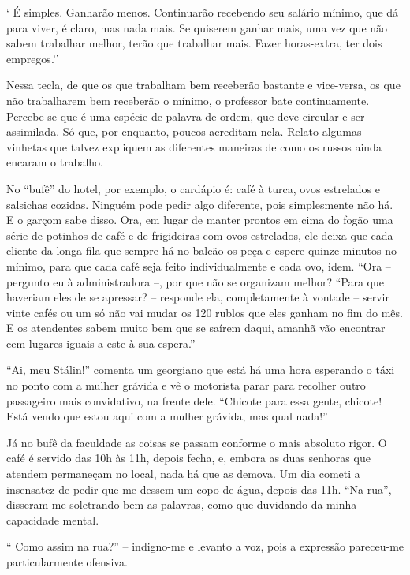 ` É simples. Ganharão menos. Continuarão recebendo seu salário mínimo,
que dá para viver, é claro, mas nada mais. Se quiserem ganhar mais, uma
vez que não sabem trabalhar melhor, terão que trabalhar mais. Fazer
horas-extra, ter dois empregos.''

Nessa tecla, de que os que trabalham bem receberão bastante e
vice-versa, os que não trabalharem bem receberão o mínimo, o professor
bate continuamente. Percebe-se que é uma espécie de palavra de ordem,
que deve circular e ser assimilada. Só que, por enquanto, poucos
acreditam nela. Relato algumas vinhetas que talvez expliquem as
diferentes maneiras de como os russos ainda encaram o trabalho.

No ``bufê'' do hotel, por exemplo, o cardápio é: café à turca, ovos
estrelados e salsichas cozidas. Ninguém pode pedir algo diferente, pois
simplesmente não há. E o garçom sabe disso. Ora, em lugar de manter
prontos em cima do fogão uma série de potinhos de café e de frigideiras
com ovos estrelados, ele deixa que cada cliente da longa fila que sempre
há no balcão os peça e espere quinze minutos no mínimo, para que cada
café seja feito individualmente e cada ovo, idem. ``Ora -- pergunto eu à
administradora --, por que não se organizam melhor? ``Para que haveriam
eles de se apressar? -- responde ela, completamente à vontade -- servir
vinte cafés ou um só não vai mudar os 120 rublos que eles ganham no fim
do mês. E os atendentes sabem muito bem que se saírem daqui, amanhã vão
encontrar cem lugares iguais a este à sua espera.''

``Ai, meu Stálin!'' comenta um georgiano que está há uma hora esperando
o táxi no ponto com a mulher grávida e vê o motorista parar para
recolher outro passageiro mais convidativo, na frente dele. ``Chicote
para essa gente, chicote! Está vendo que estou aqui com a mulher
grávida, mas qual nada!''

Já no bufê da faculdade as coisas se passam conforme o mais absoluto
rigor. O café é servido das 10h às 11h, depois fecha, e, embora as duas
senhoras que atendem permaneçam no local, nada há que as demova. Um dia
cometi a insensatez de pedir que me dessem um copo de água, depois das
11h. ``Na rua'', disseram-me soletrando bem as palavras, como que
duvidando da minha capacidade mental.

`` Como assim na rua?'' -- indigno-me e levanto a voz, pois a expressão
pareceu-me particularmente ofensiva.

